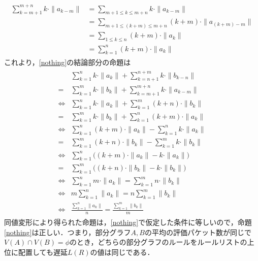 \documentclass[10pt,twocolumn]{jarticle}
\begin{document}
\begin{align}
 \begin{aligned}
   \sum_{k=m+1}^{m+n}k \cdot \|a_{k-m}\| &= \sum_{m+1 \leq k \leq m+n}k \cdot \|a_{k-m}\| \\
   &= \sum_{m+1 \leq (k+m) \leq m+n}(k+m) \cdot \|a_{(k+m)-m}\| \\
   &= \sum_{1 \leq k \leq n}(k+m) \cdot \|a_{k}\| \\
   &= \sum_{k=1}^{n}(k+m) \cdot \|a_{k}\|
 \end{aligned}
\end{align}
これより，\ref{nothing}の結論部分の命題は
\begin{align}
 \begin{aligned}
  & \sum_{k=1}^{n}k \cdot \|a_{k}\| + \sum_{k=n+1}^{n+m}k \cdot \|b_{k-n}\| \\
= &\sum_{k=1}^{m}k \cdot \|b_{k}\| + \sum_{k=m+1}^{m+n}k \cdot \|a_{k-m}\| \\
\iff %
  & \sum_{k=1}^{n}k \cdot \|a_{k}\| + \sum_{k=1}^{m}(k+n) \cdot \|b_{k}\| \\
= &\sum_{k=1}^{m}k \cdot \|b_{k}\| + \sum_{k=1}^{n}(k+m) \cdot \|a_{k}\| \\
\iff %
  & \sum_{k=1}^{n}(k+m) \cdot \|a_{k}\| -\sum_{k=1}^{n}k \cdot \|a_{k}\| \\
 = & \sum_{k=1}^{m}(k+n) \cdot \|b_{k}\| - \sum_{k=1}^{m}k \cdot \|b_{k}\| \\
\iff %
  &\sum_{k=1}^{n} \bigl((k+m) \cdot \|a_{k}\| - k \cdot \|a_{k}\| \bigr) \\
 = &\sum_{k=1}^{m} \bigl((k+n) \cdot \|b_{k}\| - k \cdot \|b_{k}\| \bigr) \\
\iff %
  & \sum_{k=1}^{n} m \cdot \|a_{k}\| = \sum_{k=1}^{m} n \cdot \|b_{k}\| \\
\iff & m \sum_{k=1}^{n} \|a_{k}\| = n \sum_{k=1}^{m} \|b_{k}\| \\
\iff & \frac{\sum_{k=1}^{n} \|a_{k}\|}{n} = \frac{\sum_{k=1}^{m} \|b_{k}\|}{m}
 \end{aligned}
\end{align}
同値変形により得られた命題は，\ref{nothing}で仮定した条件に等しいので，命題\ref{nothing}は正しい．つまり，部分グラフ$A, B$の平均の評価パケット数が同じで$V(A) \cap V(B) = \phi$のとき，どちらの部分グラフのルールをルールリストの上位に配置しても遅延$L(R)$の値は同じである．
\end{document}
